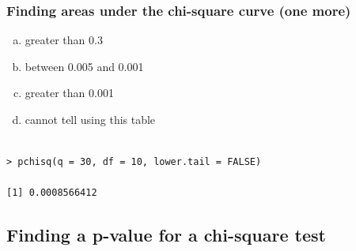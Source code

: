 \documentclass[notes,11pt, aspectratio=169]{beamer}
\begin{document}
\begin{frame}[fragile]
\frametitle{Finding areas under the chi-square curve (one more)}


{
{\small
\begin{enumerate}[(a)]
\setlength{\itemsep}{0in}
\item greater than 0.3
\item between 0.005 and 0.001
\item greater than 0.001
\item cannot tell using this table
\end{enumerate}
}
}

\pause

\begin{verbatim}

> pchisq(q = 30, df = 10, lower.tail = FALSE)

[1] 0.0008566412

\end{verbatim}

\end{frame}


\subsection{Finding a p-value for a chi-square test}

\end{document}
